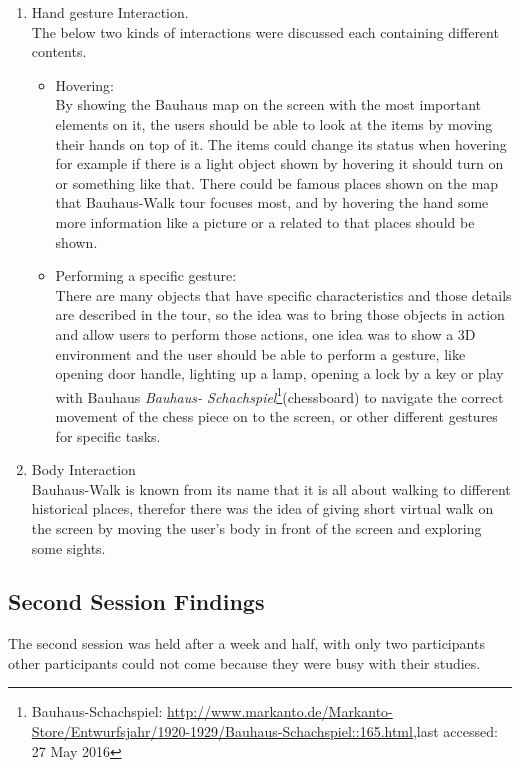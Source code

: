 \begin {enumerate}
\item	Hand gesture Interaction. \\
The below two kinds of interactions were discussed each containing different contents. 

\begin {itemize}
\item	Hovering: \\
By showing the Bauhaus map on the screen with the most important elements on it, the users should be able to look at the items by moving their hands on top of it. The items could change its status when hovering for example if there is a light object shown by hovering it should turn on or something like that.
There could be famous places shown on the map that Bauhaus-Walk tour focuses most, and by hovering the hand some more information like a picture or a related to that places should be shown.

\item	Performing a specific gesture:\\
There are many objects that have specific characteristics and those details are described in the tour, so the idea was to bring those objects in action and allow users to perform those actions, one idea was to show a 3D environment and the user should be able to perform a gesture, like opening door handle, lighting up a lamp, opening a lock by a key or play with Bauhaus \emph{Bauhaus- Schachspiel}\footnote{Bauhaus-Schachspiel: \url{http://www.markanto.de/Markanto-Store/Entwurfsjahr/1920-1929/Bauhaus-Schachspiel::165.html},last accessed: 27 May 2016 }(chessboard) to navigate the correct movement of the chess piece on to the screen, or other different gestures for specific tasks.
\end{itemize}

\item	Body Interaction  \\
Bauhaus-Walk is known from its name that it is all about walking to different historical places, therefor there was the idea of giving short virtual walk on the screen by moving the user's body in front of the screen and exploring some sights.

\end{enumerate}


\subsection{Second Session Findings}
The second session was held after a week and half, with only two participants other participants could not come because they were busy with their studies. 

